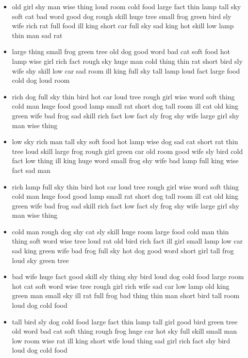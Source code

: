 \documentclass[11pt,a4wide]{article}
\begin{document}
\begin{itemize}
  \item old girl shy man wise thing loud room cold food large fact
    thin lamp tall sky soft cat bad word good dog rough skill huge
    tree small frog green bird sly wife rich rat full food ill king
    short car full sky sad king hot skill low lamp thin man sad rat

  \item large thing small frog green tree old dog good word bad cat
    soft food hot lamp wise girl rich fact rough sky huge man cold
    thing thin rat short bird sly wife shy skill low car sad room ill
    king full sky tall lamp loud fact large food cold dog loud room
  
  \item rich dog full sky thin bird hot car loud tree rough girl wise
    word soft thing cold man huge food good lamp small rat short dog
    tall room ill cat old king green wife bad frog sad skill rich fact
    low fact sly frog shy wife large girl shy man wise thing

  \item low sky rich man tall sky soft food hot lamp wise dog sad cat
    short rat thin tree loud skill large frog rough girl green car old
    room good wife sly bird cold fact low thing ill king huge word
    small frog shy wife bad lamp full king wise fact sad man

  \item rich lamp full sky thin bird hot car loud tree rough girl wise
    word soft thing cold man huge food good lamp small rat short dog
    tall room ill cat old king green wife bad frog sad skill rich fact
    low fact sly frog shy wife large girl shy man wise thing

  \item cold man rough dog shy cat sly skill huge room large food cold
    man thin thing soft word wise tree loud rat old bird rich fact ill
    girl small lamp low car sad king green wife bad frog full sky hot
    dog good word short girl tall frog loud sky green tree

  \item bad wife huge fact good skill sly thing shy bird loud dog cold
    food large room hot cat soft word wise tree rough girl rich wife
    sad car low lamp old king green man small sky ill rat full frog
    bad thing thin man short bird tall room loud dog cold food

  \item \color{red}tall bird sly dog cold food large fact thin lamp tall girl
    good bird green tree old word bad cat soft thing rough frog huge
    car hot sky full skill small man low room wise rat ill king short
    wife loud thing sad girl rich fact shy bird loud dog cold food\color{black}


\end{itemize}
\end{document}

